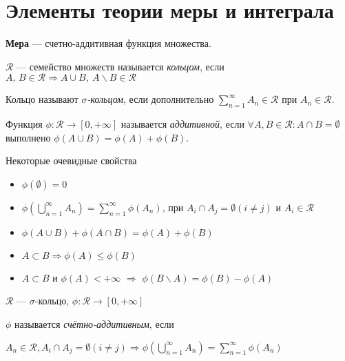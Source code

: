\newpage

\section{Элементы теории меры и интеграла}

\textbf{Мера} --- счетно-аддитивная функция множества.

\begin{definition}
  $\mathcal{R}$ --- семейство множеств называется \textit{кольцом}, если $A,\, B \in \mathcal{R} \Rightarrow A \cup B,\ A \backslash B \in \mathcal{R}$
\end{definition}

\begin{definition}
  Кольцо называют \textit{$\sigma$-кольцом}, если дополнительно $\sum_{n = 1}^{\infty} A_n \in \mathcal{R}$ при $A_n \in \mathcal{R}$. 
\end{definition}

\begin{definition}
  Функция $\phi : \mathcal{R} \to [0, +\infty]$ называется \textit{аддитивной}, если $\forall A, B \in \mathcal{R} : A\cap B = \emptyset$ выполнено
  $\phi(A\cup B) = \phi(A) + \phi(B)$.
\end{definition}

Некоторые очевидные свойства

\begin{itemize}
  \item $\phi(\emptyset) = 0$
  \item $\phi(\bigcup_{n = 1}^{\infty} A_n) = \sum_{n = 1}^{\infty} \phi(A_n)$,
        при $A_i \cap A_j = \emptyset (i \ne j)$ и $A_i \in \mathcal{R}$
  \item $\phi(A\cup B) + \phi(A \cap B) = \phi(A) + \phi(B)$
  \item $A \subset B \Rightarrow \phi(A) \leq \phi(B)$
  \item $A \subset B$ и $\phi(A) < +\infty$ $\Rightarrow$ $\phi(B\backslash A) = \phi(B) - \phi(A)$
\end{itemize}

\begin{definition}
  $\mathcal{R}$ --- $\sigma$-кольцо, $\phi: \mathcal{R} \to [0, +\infty]$

  $\phi$ называется \textit{счётно-аддитивным}, если

  $A_n \in \mathcal{R}, A_i \cap A_j = \emptyset (i \ne j) \Rightarrow \phi(\bigcup_{n=1}^{\infty} A_n) = \sum_{n = 1}^{\infty} \phi(A_n)$
\end{definition}

